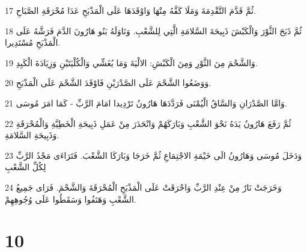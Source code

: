 \par 17 ثُمَّ قَدَّمَ التَّقْدِمَةَ وَمَلَا كَفَّهُ مِنْهَا وَاوْقَدَهَا عَلَى الْمَذْبَحِ عَدَا مُحْرَقَةِ الصَّبَاحِ.
\par 18 ثُمَّ ذَبَحَ الثَّوْرَ وَالْكَبْشَ ذَبِيحَةَ السَّلامَةِ الَّتِي لِلشَّعْبِ. وَنَاوَلَهُ بَنُو هَارُونَ الدَّمَ فَرَشَّهُ عَلَى الْمَذْبَحِ مُسْتَدِيرا.
\par 19 وَالشَّحْمَ مِنَ الثَّوْرِ وَمِنَ الْكَبْشِ: الالْيَةَ وَمَا يُغَشِّي وَالْكُلْيَتَيْنِ وَزِيَادَةَ الْكَبِدِ.
\par 20 وَوَضَعُوا الشَّحْمَ عَلَى الصَّدْرَيْنِ فَاوْقَدَ الشَّحْمَ عَلَى الْمَذْبَحِ.
\par 21 وَامَّا الصَّدْرَانِ وَالسَّاقُ الْيُمْنَى فَرَدَّدَهَا هَارُونُ تَرْدِيدا امَامَ الرَّبِّ - كَمَا امَرَ مُوسَى.
\par 22 ثُمَّ رَفَعَ هَارُونُ يَدَهُ نَحْوَ الشَّعْبِ وَبَارَكَهُمْ وَانْحَدَرَ مِنْ عَمَلِ ذَبِيحَةِ الْخَطِيَّةِ وَالْمُحْرَقَةِ وَذَبِيحَةِ السَّلامَةِ.
\par 23 وَدَخَلَ مُوسَى وَهَارُونُ الَى خَيْمَةِ الاجْتِمَاعِ ثُمَّ خَرَجَا وَبَارَكَا الشَّعْبَ. فَتَرَاءَى مَجْدُ الرَّبِّ لِكُلِّ الشَّعْبِ
\par 24 وَخَرَجَتْ نَارٌ مِنْ عِنْدِ الرَّبِّ وَاحْرَقَتْ عَلَى الْمَذْبَحِ الْمُحْرَقَةَ وَالشَّحْمَ. فَرَاى جَمِيعُ الشَّعْبِ وَهَتَفُوا وَسَقَطُوا عَلَى وُجُوهِهِمْ.

\chapter{10}

